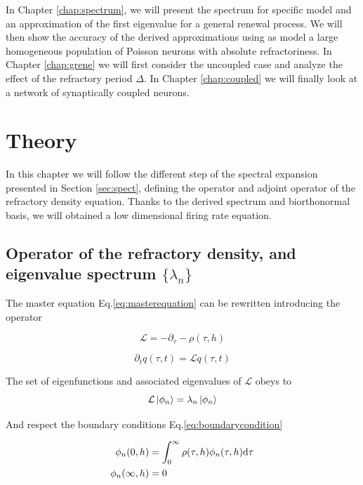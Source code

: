 \documentclass[12pt,twoside]{report}
\def \dd  {{\rm d}}
\begin{document}
In Chapter \ref{chap:spectrum}, we will present the spectrum for specific model and an approximation of the first eigenvalue for a general renewal process. We will then show the accuracy of the derived approximations using as model a large homogeneous population of Poisson neurons with absolute refractoriness.
In Chapter \ref{chap:grene} we will first consider the uncoupled case and analyze the effect of the refractory period $\Delta$. In Chapter \ref{chap:coupled} we will finally look at a network of synaptically coupled neurons.



\chapter{Theory}
\label{chap:theory}

In this chapter we will follow the different step of the spectral expansion presented in Section \ref{sec:spect}, defining the operator and adjoint operator of the refractory density equation. Thanks to the derived spectrum and biorthonormal basis, we will obtained a low dimensional firing rate equation.

\section{Operator of the refractory density, and eigenvalue spectrum $\{\lambda_n\}$}
\label{sec:op}

The master equation Eq.\eqref{eq:masterequation} can be rewritten introducing the operator 

\begin{equation}
\label{eq:Loperator}
\mathcal{L}=-\partial_\tau-\rho(\tau,h)
\end{equation}

\begin{equation}
\label{eq:masterequation2}
\partial_t q(\tau,t)=\mathcal{L}q(\tau,t)
\end{equation}

The set of eigenfunctions and associated eigenvalues of $\mathcal{L}$ obeys to
\begin{equation}
\label{eq:Loperator2}
\mathcal{L}\ket{\phi_n}=\lambda_n\ket{\phi_n}
\end{equation}

And respect the boundary conditions Eq.\eqref{eq:boundarycondition}

\begin{align}
\label{eq:boundarycondition2}
\phi_n(0,h)&=\int_0^\infty\rho(\tau,h)\phi_n(\tau,h)\dd\tau\\
\phi_n(\infty,h)&=0
\end{align}
\end{document}
